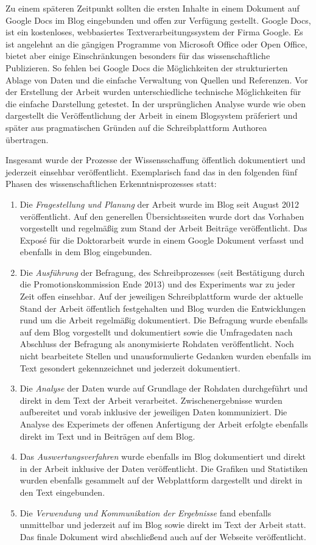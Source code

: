 Zu einem späteren Zeitpunkt sollten die ersten Inhalte in einem Dokument auf Google Docs im Blog eingebunden und offen zur Verfügung gestellt. Google Docs, ist ein kostenloses, webbasiertes Textverarbeitungssystem der Firma Google. Es ist angelehnt an die gängigen Programme von Microsoft Office oder Open Office, bietet aber einige Einschränkungen besonders für das wissenschaftliche Publizieren. So fehlen bei Google Docs die Möglichkeiten der strukturierten Ablage von Daten und die einfache Verwaltung von Quellen und Referenzen. Vor der Erstellung der Arbeit wurden unterschiedliche technische Möglichkeiten für die einfache Darstellung getestet. In der ursprünglichen Analyse wurde wie oben dargestellt die Veröffentlichung der Arbeit in einem Blogsystem präferiert und später aus pragmatischen Gründen auf die Schreibplattform Authorea übertragen.

Insgesamt wurde der Prozesse der Wissensschaffung öffentlich dokumentiert und jederzeit einsehbar veröffentlicht. Exemplarisch fand das in den folgenden fünf Phasen des wissenschaftlichen Erkenntnisprozesses statt:
\begin{enumerate}
\item Die \textit{Fragestellung und Planung} der Arbeit wurde im Blog seit August 2012 veröffentlicht. Auf den generellen Übersichtsseiten wurde dort das Vorhaben vorgestellt und regelmäßig zum Stand der Arbeit Beiträge veröffentlicht. Das Exposé für die Doktorarbeit wurde in einem Google Dokument verfasst und ebenfalls in dem Blog eingebunden.
\item Die \textit{Ausführung} der Befragung, des Schreibprozesses (seit Bestätigung durch die Promotionskommission Ende 2013) und des Experiments war zu jeder Zeit offen einsehbar. Auf der jeweiligen Schreibplattform wurde der aktuelle Stand der Arbeit öffentlich festgehalten und Blog wurden die Entwicklungen rund um die Arbeit regelmäßig dokumentiert. Die Befragung wurde ebenfalls auf dem Blog vorgestellt und dokumentiert sowie die Umfragedaten nach Abschluss der Befragung als anonymisierte Rohdaten veröffentlicht. Noch nicht bearbeitete Stellen und unausformulierte Gedanken wurden ebenfalls im Text gesondert gekennzeichnet und jederzeit dokumentiert.
\item Die \textit{Analyse} der Daten wurde auf Grundlage der Rohdaten durchgeführt und direkt in dem Text der Arbeit verarbeitet. Zwischenergebnisse wurden aufbereitet und vorab inklusive der jeweiligen Daten kommuniziert. Die Analyse des Experimets der offenen Anfertigung der Arbeit erfolgte ebenfalls direkt im Text und in Beiträgen auf dem Blog.
\item Das \textit{Auswertungsverfahren} wurde ebenfalls im Blog dokumentiert und direkt in der Arbeit inklusive der Daten veröffentlicht. Die Grafiken und Statistiken wurden ebenfalls gesammelt auf der Webplattform dargestellt und direkt in den Text eingebunden.
\item Die \textit{Verwendung und Kommunikation der Ergebnisse} fand ebenfalls unmittelbar und jederzeit auf im Blog sowie direkt im Text der Arbeit statt. Das finale Dokument wird abschließend auch auf der Webseite veröffentlicht.
\end{enumerate}

